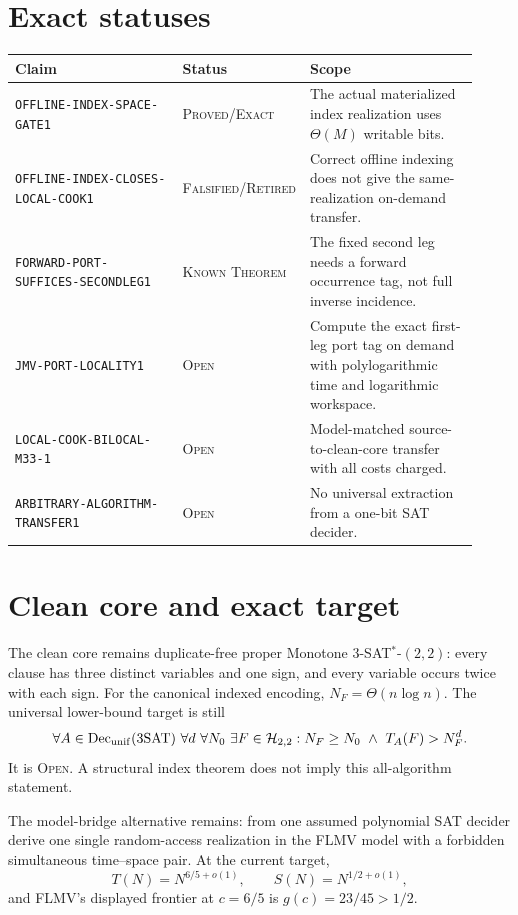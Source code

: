 \documentclass[11pt]{article}
\newcommand{\status}[1]{\textsc{#1}}
\begin{document}
\section{Exact statuses}
\begin{center}\small
\begin{tabular}{p{0.37\linewidth}p{0.18\linewidth}p{0.37\linewidth}}
\toprule Claim & Status & Scope \\
\midrule
\texttt{OFFLINE-INDEX-SPACE-GATE1} & \status{Proved/Exact} & The actual materialized index realization uses $\Theta(M)$ writable bits.\\
\texttt{OFFLINE-INDEX-CLOSES-LOCAL-COOK1} & \status{Falsified/Retired} & Correct offline indexing does not give the same-realization on-demand transfer.\\
\texttt{FORWARD-PORT-SUFFICES-SECONDLEG1} & \status{Known Theorem} & The fixed second leg needs a forward occurrence tag, not full inverse incidence.\\
\texttt{JMV-PORT-LOCALITY1} & \status{Open} & Compute the exact first-leg port tag on demand with polylogarithmic time and logarithmic workspace.\\
\texttt{LOCAL-COOK-BILOCAL-M33-1} & \status{Open} & Model-matched source-to-clean-core transfer with all costs charged.\\
\texttt{ARBITRARY-ALGORITHM-TRANSFER1} & \status{Open} & No universal extraction from a one-bit SAT decider.\\
\bottomrule
\end{tabular}
\end{center}

\section{Clean core and exact target}

The clean core remains duplicate-free proper Monotone
$3$-SAT$^*$-$(2,2)$: every clause has three distinct variables and one sign,
and every variable occurs twice with each sign.  For the canonical indexed
encoding, $N_F=\Theta(n\log n)$.  The universal lower-bound target is still
\[
\forall A\in\mathrm{Dec}_{\rm unif}(3\mathrm{SAT})\ \forall d\ \forall N_0\
\exists F\in\mathcal H_{2,2}:
N_F\ge N_0\ \wedge\ T_A(F)>N_F^d.
\]
It is \status{Open}.  A structural index theorem does not imply this
all-algorithm statement.

The model-bridge alternative remains: from one assumed polynomial SAT
decider derive one single random-access realization in the FLMV model with a
forbidden simultaneous time--space pair.  At the current target,
\[
T(N)=N^{6/5+o(1)},\qquad S(N)=N^{1/2+o(1)},
\]
and FLMV's displayed frontier at $c=6/5$ is $g(c)=23/45>1/2$.
\end{document}
